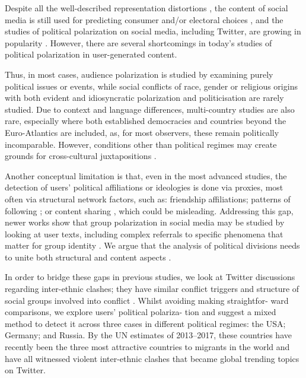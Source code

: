 Despite all the well-described representation distortions \cite{Daniels}, the content of social media is still used for predicting consumer and/or electoral choices \cite{ColleoniRozzaArvidsson}, and the studies of political polarization on social media, including Twitter, are growing in popularity \cite{Barbera}. However, there are several shortcomings in today’s studies of political polarization in user-generated content.

Thus, in most cases, audience polarization is studied by examining purely political issues or events, while social conflicts of race, gender or religious origins with both evident and idiosyncratic polarization and politicisation \cite{McCrightDunlap} are rarely studied. Due to context and language differences, multi-country studies are also rare, especially where both established democracies and countries beyond the Euro-Atlantics are included, as, for most observers, these remain politically incomparable. However, conditions other than political regimes may create grounds for cross-cultural juxtapositions \cite{BodrunovaLitvinenkoBlekanov,BodrunovaBlekanovMaksimov}.

Another conceptual limitation is that, even in the most advanced studies, the detection of users’ political affiliations or ideologies is done via proxies, most often via structural network factors, such as: friendship affiliations; patterns of following \cite{BarberaJostNagler,Rivero}; or content sharing \cite{ColleoniRozzaArvidsson}, which could be misleading. Addressing this gap, newer works show that group polarization in social media may be studied by looking at user texts, including complex referrals to specific phenomena that matter for group identity \cite{Evolvi}. We argue that the analysis of political divisions needs to unite both structural and content aspects \cite{Bodrunova}.

In order to bridge these gaps in previous studies, we look at Twitter discussions regarding inter-ethnic clashes; they have similar conflict triggers and structure of social groups involved into conflict \cite{BodrunovaLitvinenkoBlekanov2017}. Whilst avoiding making straightfor- ward comparisons, we explore users’ political polariza- tion and suggest a mixed method to detect it across three cases in different political regimes: the USA; Germany; and Russia. By the UN estimates of 2013–2017, these countries have recently been the three most attractive countries to migrants in the world \cite{UN2013,UN2017} and have all witnessed violent inter-ethnic clashes that became global trending topics on Twitter.


